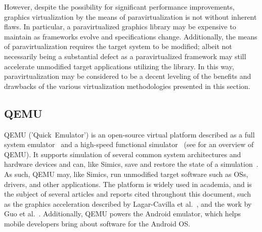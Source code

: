However, despite the possibility for significant performance improvements, graphics virtualization by the means of paravirtualization is not without inherent flaws.
In particular, a paravirtualized graphics library may be expensive to maintain as frameworks evolve and specifications change.
Additionally, the means of paravirtualization requires the target system to be modified; albeit not necessarily being a substantial defect as a paravirtualized framework may still accelerate unmodified target applications utilizing the library.
In this way, paravirtualization may be considered to be a decent leveling of the benefits and drawbacks of the various virtualization methodologies presented in this section.

\subsection{QEMU}
\label{sec:backgroundandrelatedwork_qemu}
QEMU ('Quick~Emulator') is an open-source virtual platform described as a full system emulator~ and a high-speed functional simulator~ (see  for an overview of QEMU).
It supports simulation of several common system architectures and hardware devices and can, like Simics, save and restore the state of a simulation~.
As such, QEMU may, like Simics, run unmodified target software such as OSs, drivers, and other applications.
The platform is widely used in academia, and is the subject of several articles and reports cited throughout this document, such as the graphics acceleration described by Lagar-Cavilla et al.~, and the work by Guo et al.~.
Additionally, QEMU powers the Android emulator, which helps mobile developers bring about software for the Android OS.

